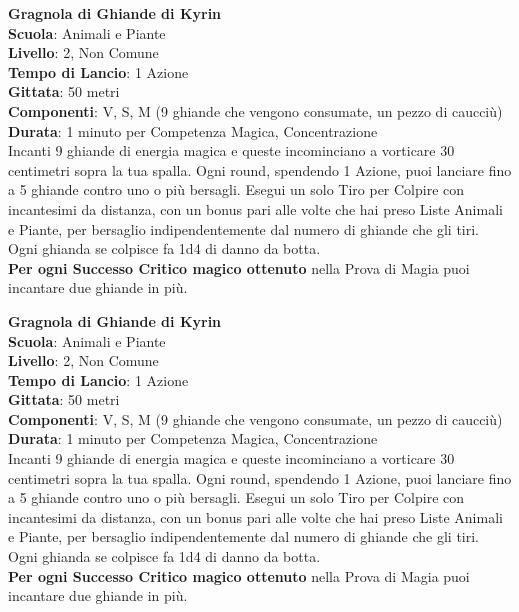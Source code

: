 \begin{multicols}{2}
\medskip\textbf{Gragnola di Ghiande di Kyrin}\\
\textbf{Scuola}: Animali e Piante\\
\textbf{Livello}: 2, Non Comune\\
\textbf{Tempo di Lancio}: 1 Azione\\
\textbf{Gittata}: 50 metri\\
\textbf{Componenti}: V, S, M (9 ghiande che vengono consumate, un pezzo di caucciù)\\
\textbf{Durata}: 1 minuto per Competenza Magica, Concentrazione\\
Incanti 9 ghiande di energia magica e queste incominciano a vorticare 30 centimetri sopra la tua spalla.
Ogni round, spendendo 1 Azione, puoi lanciare fino a 5 ghiande contro uno o più bersagli. Esegui un solo Tiro per Colpire con incantesimi da distanza, con un bonus pari alle volte che hai preso Liste Animali e Piante, per bersaglio indipendentemente dal numero di ghiande che gli tiri. Ogni ghianda se colpisce fa 1d4 di danno da botta.\\
\textbf{Per ogni Successo Critico magico ottenuto} nella Prova di Magia puoi incantare due ghiande in più.

\medskip\textbf{Gragnola di Ghiande di Kyrin}\\
\textbf{Scuola}: Animali e Piante\\
\textbf{Livello}: 2, Non Comune\\
\textbf{Tempo di Lancio}: 1 Azione\\
\textbf{Gittata}: 50 metri\\
\textbf{Componenti}: V, S, M (9 ghiande che vengono consumate, un pezzo di caucciù)\\
\textbf{Durata}: 1 minuto per Competenza Magica, Concentrazione\\
Incanti 9 ghiande di energia magica e queste incominciano a vorticare 30 centimetri sopra la tua spalla.
Ogni round, spendendo 1 Azione, puoi lanciare fino a 5 ghiande contro uno o più bersagli. Esegui un solo Tiro per Colpire con incantesimi da distanza, con un bonus pari alle volte che hai preso Liste Animali e Piante, per bersaglio indipendentemente dal numero di ghiande che gli tiri. Ogni ghianda se colpisce fa 1d4 di danno da botta.\\
\textbf{Per ogni Successo Critico magico ottenuto} nella Prova di Magia puoi incantare due ghiande in più.


\end{multicols}
